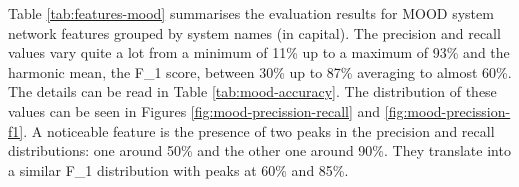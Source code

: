 
Table \ref{tab:features-mood} summarises the evaluation results for MOOD system network features grouped by system names (in capital). The precision and recall values vary quite a lot from a minimum of 11\% up to a maximum of 93\% and the harmonic mean, the F_1 score, between 30\% up to 87\%  averaging to almost 60\%. The details can be read in Table \ref{tab:mood-accuracy}. The distribution of these values can be seen in Figures \ref{fig:mood-precission-recall} and \ref{fig:mood-precission-f1}. A noticeable feature is the presence of two peaks in the precision and recall distributions: one around 50\% and the other one around 90\%. They translate into a similar F_1 distribution with peaks at 60\% and 85\%.

